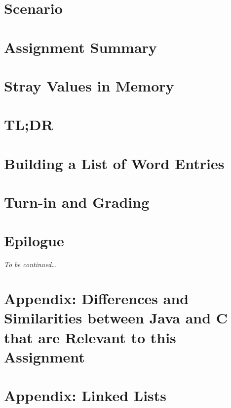 \documentclass[12pt]{article}
\begin{document}
    \labidentifier


    \softwareengineeringfrontmatter

    \section*{Scenario}                                             \scenariointroduction

    \section{Assignment Summary}                                    

    \section{Stray Values in Memory} \label{sec:archiesCode}        

    \section{TL;DR} \label{sec:tldr}                                

    \section{Building a List of Word Entries} \label{sec:challengeResponse}  

    \section{Turn-in and Grading}                                   

    \section*{Epilogue}                                             \scenariowrapup

    \textit{To be continued\dots}

    \newpage\appendix

    \section{Appendix: Differences and Similarities between Java and C that are Relevant to this Assignment}
                                                                    

    \section{Appendix: Linked Lists} \label{sec:linkedLists}        
\end{document}
